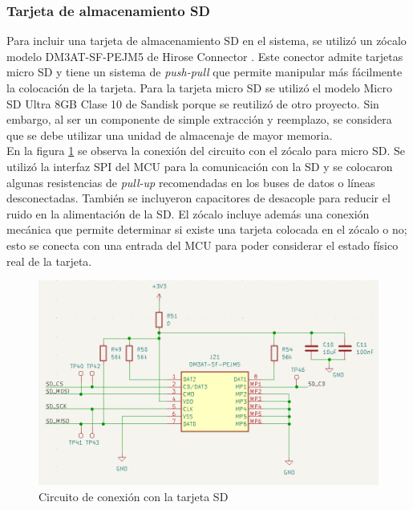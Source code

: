 \subsubsection{Tarjeta de almacenamiento SD}

Para incluir una tarjeta de almacenamiento SD en el sistema, se utilizó un zócalo modelo DM3AT-SF-PEJM5 de Hirose Connector \cite{DM3AT-SF-PEJM5}. Este conector admite tarjetas micro SD y tiene un sistema de \textit{push-pull} que permite manipular más fácilmente la colocación de la tarjeta. Para la tarjeta micro SD se utilizó el modelo Micro SD Ultra 8GB Clase 10 de Sandisk \cite{sd_sandisk} porque se reutilizó de otro proyecto. Sin embargo, al ser un componente de simple extracción y reemplazo, se considera que se debe utilizar una unidad de almacenaje de mayor memoria. \\

En la figura \ref{fig:sd_sch} se observa la conexión del circuito con el zócalo para micro SD. Se utilizó la interfaz SPI del MCU para la comunicación con la SD y se colocaron algunas resistencias de \textit{pull-up} recomendadas en los buses de datos o líneas desconectadas. También se incluyeron capacitores de desacople para reducir el ruido en la alimentación de la SD. El zócalo incluye además una conexión mecánica que permite determinar si existe una tarjeta colocada en el zócalo o no; esto se conecta con una entrada del MCU para poder considerar el estado físico real de la tarjeta. 



\begin{figure}[H]
    \centering
    \includegraphics[width = \linewidth]{img/sd_sch.png}
    \caption{Circuito de conexión con la tarjeta SD}
    \label{fig:sd_sch}
\end{figure}    